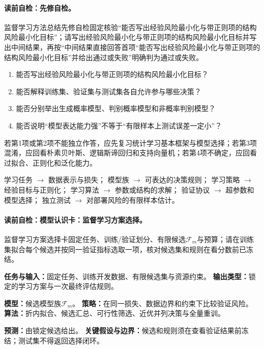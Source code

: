 \label{struct:V3-C07-CH03}
\paragraph{读前自检：先修自检。}监督学习方法总结先修自检固定核验“能否写出经验风险最小化与带正则项的结构风险最小化目标”；请写出经验风险最小化与带正则项的结构风险最小化目标并写出中间结果，再按“中间结果直接回答首项“能否写出经验风险最小化与带正则项的结构风险最小化目标”并给出通过或失败”明确判为通过或失败。\par

\begin{precheckbox}
\begin{enumerate}[leftmargin=2.2em]
  \item 能否写出经验风险最小化与带正则项的结构风险最小化目标？
  \item 能否解释训练集、验证集与测试集各自允许参与哪些决策？
  \item 能否分别举出生成概率模型、判别概率模型和非概率判别模型？
  \item 能否说明“模型表达能力强”不等于“有限样本上测试误差一定小”？
\end{enumerate}
若第1项或第2项不能独立作答，应先复习统计学习基本框架与模型选择；若第3项混淆，应回看朴素贝叶斯、逻辑斯谛回归和支持向量机；若第4项不确定，应回看过拟合、正则化和泛化能力。
\end{precheckbox}

\label{struct:V3-C07-CH04}
\begin{dependencybox}
学习任务 $\to$ 数据表示与损失；
模型族 $\to$ 可表达的决策规则；
学习策略 $\to$ 经验目标与正则化；
学习算法 $\to$ 参数或结构的求解；
验证协议 $\to$ 超参数和模型选择；
独立测试 $\to$ 对部署风险的有限样本估计。
\end{dependencybox}

\paragraph{读前自检：模型认识卡：监督学习方案选择。}监督学习方案选择卡固定任务、训练/验证划分、有限候选$\mathcal F_m$与预算；请在训练集拟合每个候选并按同一验证指标选取一项，核对候选集和规则在看分数前已冻结。\par

\begin{keypointbox}[title=模型认识卡：监督学习方案选择]
\textbf{任务与输入：}固定任务、训练开发数据、有限候选集与资源约束。\quad
\textbf{输出类型：}锁定的学习方案与一次最终评估规则。\par
\textbf{模型：}候选模型族$\mathcal F_m$。\quad
\textbf{策略：}在同一损失、数据边界和约束下比较验证风险。\quad
\textbf{算法：}折内拟合、候选汇总、可行性筛选、近优并列决策与全量重训。\par
\textbf{预测：}由锁定候选给出。\quad
\textbf{关键假设与边界：}候选和规则须在查看验证结果前冻结；测试集不得返回选择闭环。
\end{keypointbox}

